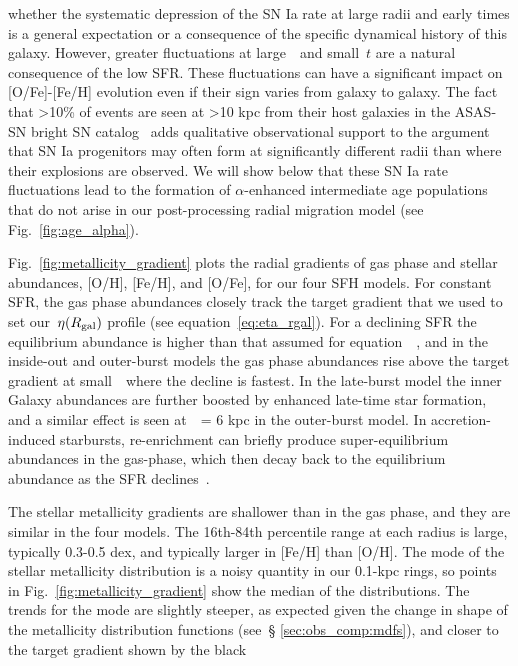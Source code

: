 \documentclass[draft2.tex]{subfiles}
\begin{document}
whether the systematic depression of the SN Ia rate at large radii and early 
times is a general expectation or a consequence of the specific dynamical 
history of this galaxy. 
However, greater fluctuations at large~\rgal~and small~$t$ are a natural 
consequence of the low SFR. These fluctuations can have a significant impact 
on [O/Fe]-[Fe/H] evolution even if their sign varies from galaxy to galaxy. 
The fact that >10\% of events are seen at >10 kpc from their host galaxies in 
the ASAS-SN bright SN catalog~\citep{Holoien2019} adds qualitative 
observational support to the argument that SN Ia progenitors may often form at 
significantly different radii than where their explosions are observed. 
We will show below that these SN Ia rate fluctuations lead to the formation of 
$\alpha$-enhanced intermediate age populations that do not arise in our 
post-processing radial migration model (see Fig.~\ref{fig:age_alpha}). 
\par 
Fig.~\ref{fig:metallicity_gradient} plots the radial gradients of gas phase 
and stellar abundances, [O/H], [Fe/H], and [O/Fe], for our four SFH models. 
For constant SFR, the gas phase abundances closely track the target gradient 
that we used to set our~$\eta(R_\text{gal})$ profile (see equation~\ref{eq:eta_rgal}). 
For a declining SFR the equilibrium abundance is higher than that assumed for 
equation~~\citep[see][]{Weinberg2017}, and in the inside-out 
and outer-burst models the gas phase abundances rise above the target gradient 
at small~\rgal~where the decline is fastest. 
In the late-burst model the inner Galaxy abundances are further boosted by 
enhanced late-time star formation, and a similar effect is seen at~\rgal~= 6 
kpc in the outer-burst model. 
In accretion-induced starbursts, re-enrichment can briefly produce 
super-equilibrium abundances in the gas-phase, which then decay back to the 
equilibrium abundance as the SFR declines~\citep{Johnson2020}. 
\par 
The stellar metallicity gradients are shallower than in the gas phase, and 
they are similar in the four models. 
The 16th-84th percentile range at each radius is large, typically 0.3-0.5 
dex, and typically larger in [Fe/H] than [O/H]. 
The mode of the stellar metallicity distribution is a noisy quantity in our 
0.1-kpc rings, so points in Fig.~\ref{fig:metallicity_gradient} show the 
median of the distributions. 
The trends for the mode are slightly steeper, as expected given the change in 
shape of the metallicity distribution functions (see~\S 
\ref{sec:obs_comp:mdfs}), and closer to the target gradient shown by the black 
\end{document}
